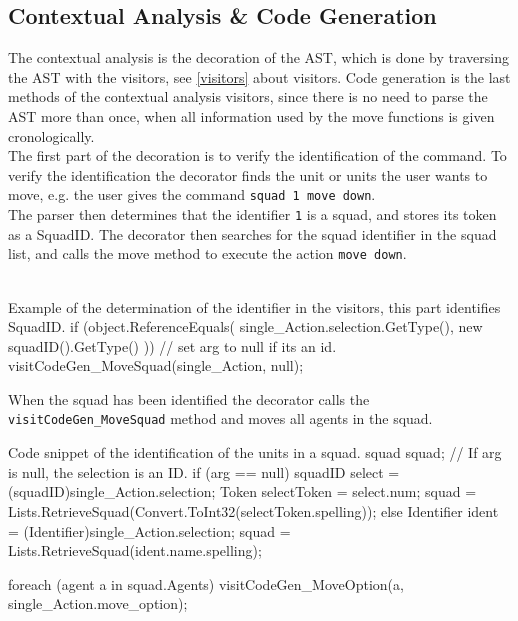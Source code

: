 \subsection{Contextual Analysis \& Code Generation}
\label{sec:ai_contextual_analysis}
The contextual analysis is the decoration of the AST, which is done by traversing the AST with the visitors, see \ref{visitors} about visitors. Code generation is the last methods of the contextual analysis visitors, since there is no need to parse the AST more than once, when all information used by the move functions is given cronologically.\\
The first part of the decoration is to verify the identification of the command.
To verify the identification the decorator finds the unit or units the user wants to move, e.g. the user gives the command \texttt{squad 1 move down}.\\
The parser then determines that the identifier \texttt{1} is a squad, and stores its token as a SquadID. The decorator then searches for the squad identifier in the squad list, and calls the move method to execute the action \texttt{move down}.\\
\\

\begin{source}{Example of the determination of the identifier in the visitors, this part identifies SquadID.}{}
if (object.ReferenceEquals(
	single_Action.selection.GetType(), 
	new squadID().GetType()
	))
	{
	// set arg to null if its an id.
	visitCodeGen_MoveSquad(single_Action, null);
	}
\end{source}

When the squad has been identified the decorator calls the \texttt{visitCodeGen\_MoveSquad} method and moves all agents in the squad.\\

\begin{source}{Code snippet of the identification of the units in a squad.}{}
squad squad;
// If arg is null, the selection is an ID.
if (arg == null)
	{
    squadID select = (squadID)single_Action.selection;
    Token selectToken = select.num;
    squad = Lists.RetrieveSquad(Convert.ToInt32(selectToken.spelling));
	}
else
    {
		Identifier ident = (Identifier)single_Action.selection;
		squad = Lists.RetrieveSquad(ident.name.spelling);
	}

	foreach (agent a in squad.Agents)
	{
		visitCodeGen_MoveOption(a, single_Action.move_option);
	}
\end{source}

